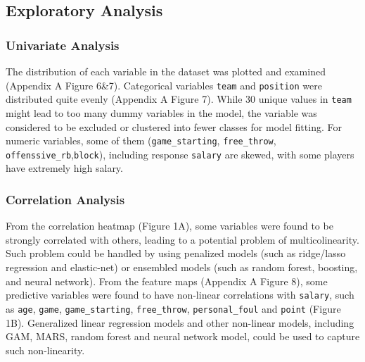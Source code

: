 \documentclass[
]{article}
\begin{document}
\hypertarget{exploratory-analysis}{%
\subsection{Exploratory Analysis}\label{exploratory-analysis}}

\hypertarget{univariate-analysis}{%
\subsubsection{Univariate Analysis}\label{univariate-analysis}}

The distribution of each variable in the dataset was plotted and
examined (Appendix A Figure 6\&7). Categorical variables \texttt{team}
and \texttt{position} were distributed quite evenly (Appendix A Figure
7). While 30 unique values in \texttt{team} might lead to too many dummy
variables in the model, the variable was considered to be excluded or
clustered into fewer classes for model fitting. For numeric variables,
some of them (\texttt{game\_starting}, \texttt{free\_throw},
\texttt{offenssive\_rb},\texttt{block}), including response
\texttt{salary} are skewed, with some players have extremely high
salary.

\hypertarget{correlation-analysis}{%
\subsubsection{Correlation Analysis}\label{correlation-analysis}}

From the correlation heatmap (Figure 1A), some variables were found to
be strongly correlated with others, leading to a potential problem of
multicolinearity. Such problem could be handled by using penalized
models (such as ridge/lasso regression and elastic-net) or ensembled
models (such as random forest, boosting, and neural network). From the
feature maps (Appendix A Figure 8), some predictive variables were found
to have non-linear correlations with \texttt{salary}, such as
\texttt{age}, \texttt{game}, \texttt{game\_starting},
\texttt{free\_throw}, \texttt{personal\_foul} and \texttt{point} (Figure
1B). Generalized linear regression models and other non-linear models,
including GAM, MARS, random forest and neural network model, could be
used to capture such non-linearity.
\end{document}
